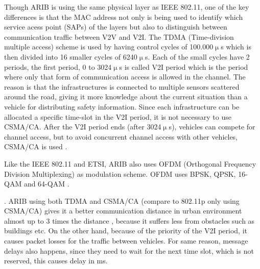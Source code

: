 Though ARIB is using the same physical layer as IEEE 802.11, one of the key differences is that the MAC address not only is being used to identify which service acess point (SAPs) of the layers but also to distinguish between communication traffic between V2V and V2I. The TDMA (Time-division multiple access) scheme is used by having control cycles of 100.000$\upmu$s which is then divided into 16 smaller cycles of  6240$\upmu$s. Each of the small cycles have 2 periods, the first period, 0 to 3024$\upmu$s is called V2I period which is the period where only that form of communication access is allowed in the channel. The reason is that the infrastructures is connected to multiple sensors scattered around the road, giving it more knowledge about the current situation than a vehicle for distributing safety information. Since each infrastructure can be allocated a specific time-slot in the V2I period, it is not necessary to use CSMA/CA. After the V2I period ends (after 3024$\upmu$s), vehicles can compete for channel access, but to avoid concurrent channel access with other vehicles, CSMA/CA is used \cite{Heinovski2016PerformanceSTD-T109}.\par
% 
Like the IEEE 802.11 and ETSI, ARIB also uses OFDM (Orthogonal Frequency Division 
Multiplexing) as modulation scheme. OFDM uses BPSK, QPSK, 16-QAM and 64-QAM \footnotemark.\par.
% 
% 
ARIB using both TDMA and CSMA/CA (compare to 802.11p only using CSMA/CA) gives it a better communication distance in urban environment almost up to 3 times the distance \cite{Heinovski2016PerformanceSTD-T109}, because it suffers less from obstacles such as buildings etc. On the other hand, because of the priority of the V2I period, it causes packet losses for the traffic between vehicles. For same reason, message delays also happens, since they need to wait for the next time slot, which is not reserved, this causes delay in ms. 